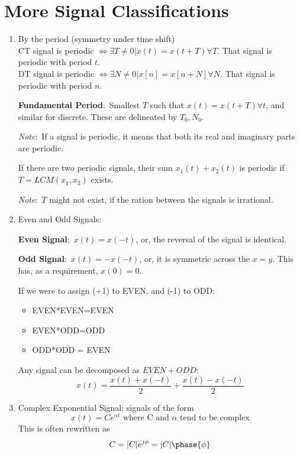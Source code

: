 \documentclass[nobib]{tufte-handout}
\newcommand{\defn}[2]{
        \begin{defbox}
        \noindent\textbf{#1}:\ #2
        \end{defbox}
}
\newcommand{\note}[1]{
        \begin{notebox}
        \noindent\textit{Note}:\ #1
        \end{notebox}
}
\begin{document}
\section{More Signal Classifications}
\begin{enumerate}[start = 3]
    \item By the period (symmetry under time shift)\\ CT signal is periodic $\iff \exists
              T\neq 0 | x(t)=x(t+T) \forall T$. That signal is periodic with period $t$.\\ DT
          signal is periodic $\iff \exists N\neq 0 | x[n]=x[n+N] \forall N$. That signal
          is periodic with period $n$. \defn{Fundamental Period}{Smallest $T$ such that
              $x(t)=x(t+T)\forall t$, and similar for discrete. These are delineated by
              $T_0,N_0$.} \note{If a signal is periodic, it means that both its real and
              imaginary parts are periodic.} If there are two periodic signals, their sum
          $x_1(t)+x_2(t)$ is periodic if $T = LCM(x_1,x_2)$ exists. \note{$T$ might not
              exist, if the ration between the signals is irrational.}
    \item Even and Odd Signals: \defn{Even Signal}{$x(t) = x(-t)$, or, the reversal of
              the signal is identical.} \defn{Odd Signal}{$x(t) = -x(-t)$, or, it is
              symmetric across the $x=y$. This has, as a requirement, $x(0) = 0$.} If we were
          to assign (+1) to EVEN, and (-1) to ODD:
          \begin{itemize}
              \item EVEN*EVEN=EVEN
              \item EVEN*ODD=ODD
              \item ODD*ODD = EVEN
          \end{itemize}
          Any signal can be decomposed as $EVEN+ODD$:
          \begin{equation*}
              x(t) = \frac{x(t)+x(-t)}{2}+\frac{x(t)-x(-t)}{2}
          \end{equation*}
    \item Complex Exponential Signal: signals of the form
          \begin{equation*}
              x(t) = Ce^{\alpha t} \text{ where C and $\alpha$ tend to be complex}
          \end{equation*}
          This is often rewritten as
          \begin{align*}
              C             & = |C|e^{j\phi} = |C|\phase{\phi}        \\

\end{align*}
\end{enumerate}
\end{document}
